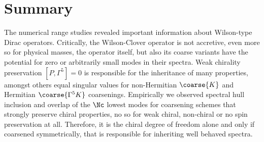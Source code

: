 \section{Summary}
\label{sec:chirality:summary}



The numerical range studies revealed important information about Wilson-type Dirac operators.
Critically, the Wilson-Clover operator is not accretive, even more so for physical masses, \ie the operator itself, but also its coarse variants have the potential for zero or arbitrarily small modes in their spectra.
Weak chirality preservation $[P, \Gamma^{5}]=0$ is responsible for the inheritance of many properties, amongst others equal singular values for non-Hermitian $\coarse{K}$ and Hermitian $\coarse{\Gamma^{5} K}$ coarsenings.
Empirically we observed spectral hull inclusion and overlap of the $\Nc$ lowest modes for coarsening schemes that strongly preserve chiral properties, no so for weak chiral, non-chiral or no spin preservation at all.
Therefore, it is the chiral degree of freedom alone and only if coarsened symmetrically, that is responsible for inheriting well behaved spectra.



